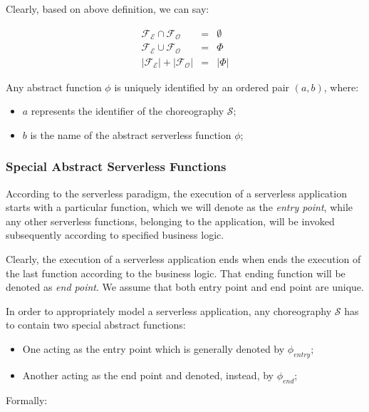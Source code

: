 Clearly, based on above definition, we can say: 

\begin{eqnarray}
\mathscr{F_E} \cap \mathscr{F_O} & = & \emptyset \\
\mathscr{F_E} \cup \mathscr{F_O} & = & \Phi \\
|\mathscr{F_E}| + |\mathscr{F_O}| &=& |\Phi| 
\end{eqnarray}

Any abstract function $\phi$ is uniquely identified by an ordered pair $(a, b)$, where:
\begin{itemize}
	\item $a$ represents the identifier of the choreography $\mathcal{S}$;
	\item $b$ is the name of the abstract serverless function $\phi$;
\end{itemize}


\subsubsection{Special Abstract Serverless Functions} 

According to the serverless paradigm, the execution of a serverless application starts with a particular function, which we will denote as the \textit{entry point}, while any other serverless functions, belonging to the application, will be invoked subsequently according to specified business logic. 

Clearly, the execution of a serverless application ends when ends the execution of the last function according to the business logic. That ending function will be denoted as \textit{end point}. We assume that both entry point and end point are unique.

In order to appropriately model a serverless application, any choreography $\mathcal{S}$ has to contain two special abstract functions:

\begin{itemize}
	\item One acting as the entry point which is generally denoted by $\phi_{entry}$;
	\item Another acting as the end point and denoted, instead, by $\phi_{end}$;
\end{itemize}

Formally:

